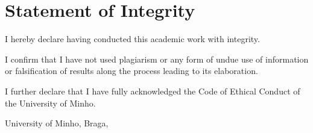 \chapter*{Statement of Integrity}
\noindent
I hereby declare having conducted this academic work with integrity.

\noindent
I confirm that I have not used plagiarism or any form of undue use of information or falsification of results along the process leading to its elaboration.

\noindent
I further declare that I have fully acknowledged the Code of Ethical Conduct of the University of Minho.

\phantom{space}

\noindent
University of Minho, Braga, \myear

\vspace{25mm}
\noindent\theauthor